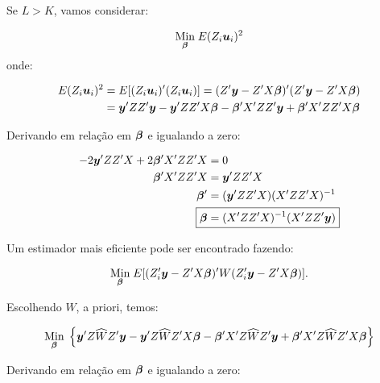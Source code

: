 \documentclass[11pt,oneside,a4paper]{article}
\numberwithin{equation}{section}
\begin{document}
\vspace{1 em}
Se $L > K$, vamos considerar:

\vspace{-1 em}
\begin{align*}
\underset{\boldsymbol{\beta}}{\text{Min}} \;
E( Z_{i}\boldsymbol{u}_{i} )^2
\end{align*}
\noindent onde:

\vspace{-1 em}
\begin{align*}
E( Z_{i}\boldsymbol{u}_{i} )^2 
&=
E[ ( Z_{i}\boldsymbol{u}_{i} )' ( Z_{i}\boldsymbol{u}_{i} ) ]
=
( Z' \boldsymbol{y} - Z' X \boldsymbol{\beta} )' ( Z' \boldsymbol{y} - Z' X \boldsymbol{\beta} )
\\
&=
\boldsymbol{y}' ZZ' \boldsymbol{y}
-
\boldsymbol{y}' ZZ' X \boldsymbol{\beta}
-
\boldsymbol{\beta}' X' ZZ' \boldsymbol{y}
+
\boldsymbol{\beta}' X' ZZ' X \boldsymbol{\beta}
\end{align*}

Derivando em relação em $\boldsymbol{\beta}$ e igualando a zero:

\vspace{-1 em}
\begin{align*}
-2 \mbs{y}' ZZ' X + 2 \mbs{\beta}'X' ZZ' X &= 0
\\
\mbs{\beta}'X' ZZ' X &= \mbs{y}' ZZ' X 
\\
\mbs{\beta}' &= ( \mbs{y}' ZZ' X ) ( X' ZZ' X )^{-1}
\\
\Aboxed{
\mbs{\beta} &= ( X' ZZ' X )^{-1} ( X' ZZ' \mbs{y} ) }
\end{align*}

Um estimador mais eficiente pode ser encontrado fazendo:

\vspace{-1 em}
\begin{align*}
\underset{\boldsymbol{\beta}}{\text{Min}} \;
E[ ( Z_{i}' \boldsymbol{y} - Z' X \boldsymbol{\beta} )' W ( Z_{i}' \boldsymbol{y} - Z' X \boldsymbol{\beta} ) ].
\end{align*}

\noindent
Escolhendo $\widehat{W}$, a priori, temos:

\vspace{-1 em}
\begin{align*}
\underset{\boldsymbol{\beta}}{\text{Min}} \;
\left\{ 
\boldsymbol{y}' Z \widehat{W} Z' \boldsymbol{y}
-
\boldsymbol{y}' Z \widehat{W} Z' X \boldsymbol{\beta}
-
\boldsymbol{\beta}' X'  Z \widehat{W} Z' \boldsymbol{y}
+
\boldsymbol{\beta}' X'  Z \widehat{W} Z' X \boldsymbol{\beta}
\right\}
\end{align*}

Derivando em relação em $\boldsymbol{\beta}$ e igualando a zero:
\end{document}
